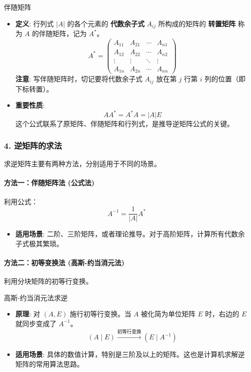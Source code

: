 \documentclass[a4paper,12pt]{ctexart}
\begin{document}
\begin{mydef}{伴随矩阵}{}
\begin{itemize}
    \item \textbf{定义}: 行列式 $|A|$ 的各个元素的 \textbf{代数余子式} $A_{ij}$ 所构成的矩阵的 \textbf{转置矩阵} 称为 $A$ 的伴随矩阵，记为 $A^*$。
    \[
    A^* = 
    \begin{pmatrix}
    A_{11} & A_{21} & \cdots & A_{n1} \\
    A_{12} & A_{22} & \cdots & A_{n2} \\
    \vdots & \vdots & \ddots & \vdots \\
    A_{1n} & A_{2n} & \cdots & A_{nn}
    \end{pmatrix}
    \]
    \textbf{注意}: 写伴随矩阵时，切记要将代数余子式 $A_{ij}$ 放在第 $j$ 行第 $i$ 列的位置（即下标转置）。
    
    \item \textbf{重要性质}: 
    \[AA^* = A^*A = |A|E\]
    这个公式联系了原矩阵、伴随矩阵和行列式，是推导逆矩阵公式的关键。
\end{itemize}
\end{mydef}

\subsubsection{4. 逆矩阵的求法}
求逆矩阵主要有两种方法，分别适用于不同的场景。

\paragraph{方法一：伴随矩阵法 (公式法)}
利用公式：
\[
A^{-1} = \frac{1}{|A|} A^*
\]
\begin{itemize}
    \item \textbf{适用场景}: 二阶、三阶矩阵，或者理论推导。对于高阶矩阵，计算所有代数余子式极其繁琐。
\end{itemize}

\paragraph{方法二：初等变换法 (高斯-约当消元法)}
利用分块矩阵的初等行变换。
\begin{myalgo}{高斯-约当消元法求逆}{}
\begin{itemize}
    \item \textbf{原理}: 对 $(A, E)$ 施行初等行变换。当 $A$ 被化简为单位矩阵 $E$ 时，右边的 $E$ 就同步变成了 $A^{-1}$。
    \[
    (A \mid E) \xrightarrow{\text{初等行变换}} (E \mid A^{-1})
    \]
    \item \textbf{适用场景}: 具体的数值计算，特别是三阶及以上的矩阵。这也是计算机求解逆矩阵的常用算法思路。
\end{itemize}
\end{myalgo}
\end{document}
